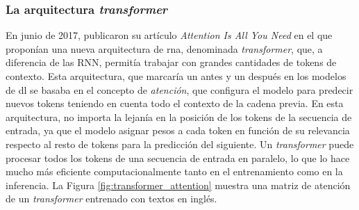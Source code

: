 \subsubsection{La arquitectura \emph{transformer}}
En junio de 2017, \citeauthor{vaswaniAttentionAllYou2017} publicaron su artículo \emph{Attention Is All You Need} \citep{vaswaniAttentionAllYou2017} en el que proponían una nueva arquitectura de \gls{rna}, denominada \emph{transformer}, que, a diferencia de las RNN, permitía trabajar con grandes cantidades de tokens de contexto. Esta arquitectura, que marcaría un antes y un después en los modelos de \gls{dl} se basaba en el concepto de \emph{atención}, que configura el modelo para predecir nuevos tokens teniendo en cuenta todo el contexto de la cadena previa. En esta arquitectura, no importa la lejanía en la posición de los tokens de la secuencia de entrada, ya que el modelo asignar pesos a cada token en función de su relevancia respecto al resto de tokens para la predicción del siguiente. Un \emph{transformer} puede procesar todos los tokens de una secuencia de entrada en paralelo, lo que lo hace mucho más eficiente computacionalmente tanto en el entrenamiento como en la inferencia. La Figura \ref{fig:transformer_attention} muestra una matriz de atención de un \emph{transformer} entrenado con textos en inglés.



